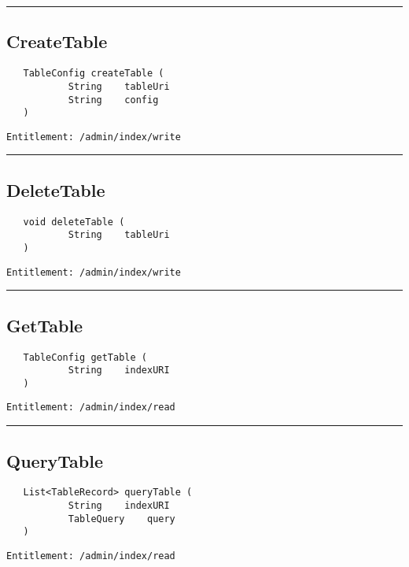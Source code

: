 \rule{12cm}{2pt}
\subsection{CreateTable}
\label{Api:CreateTable}
\begin{Verbatim}
   TableConfig createTable (
           String    tableUri
           String    config
   )
\end{Verbatim}
\begin{Verbatim}[formatcom=\color{Maroon}]
  Entitlement: /admin/index/write
\end{Verbatim}



\rule{12cm}{2pt}
\subsection{DeleteTable}
\label{Api:DeleteTable}
\begin{Verbatim}
   void deleteTable (
           String    tableUri
   )
\end{Verbatim}
\begin{Verbatim}[formatcom=\color{Maroon}]
  Entitlement: /admin/index/write
\end{Verbatim}



\rule{12cm}{2pt}
\subsection{GetTable}
\label{Api:GetTable}
\begin{Verbatim}
   TableConfig getTable (
           String    indexURI
   )
\end{Verbatim}
\begin{Verbatim}[formatcom=\color{Maroon}]
  Entitlement: /admin/index/read
\end{Verbatim}



\rule{12cm}{2pt}
\subsection{QueryTable}
\label{Api:QueryTable}
\begin{Verbatim}
   List<TableRecord> queryTable (
           String    indexURI
           TableQuery    query
   )
\end{Verbatim}
\begin{Verbatim}[formatcom=\color{Maroon}]
  Entitlement: /admin/index/read
\end{Verbatim}



